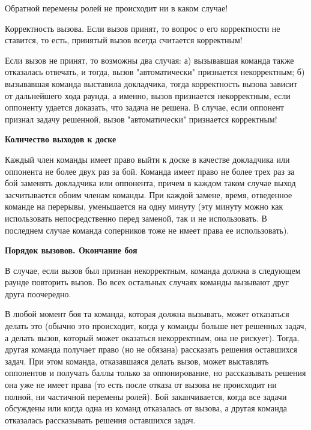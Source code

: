 \documentclass{article}
\begin{document}
Обратной перемены ролей не происходит ни в каком случае!

Корректность вызова. Если вызов принят, то вопрос о его корректности не ставится, то есть, принятый вызов всегда считается корректным!

Если вызов не принят, то возможны два случая: 
а) вызывавшая команда также отказалась отвечать, и тогда, вызов "автоматически" признается некорректным; 
б) вызывавшая команда выставила докладчика, тогда корректность вызова зависит от дальнейшего хода раунда, а именно, вызов признается некорректным, если оппоненту удается доказать, что задача не решена. В случае, если оппонент признал задачу решенной, вызов "автоматически" признается корректным!

\begin{center}
\textbf{Количество выходов к доске}
\end{center}

Каждый член команды имеет право выйти к доске в качестве докладчика или оппонента не более двух раз за бой. Команда имеет право не более трех раз за бой заменять докладчика или оппонента, причем в каждом таком случае выход засчитывается обоим членам команды. При каждой замене, время, отведенное команде на перерывы, уменьшается на одну минуту (эту минуту можно как использовать непосредственно перед заменой, так и не использовать. В последнем случае команда соперников тоже не имеет права ее использовать).

\begin{center}
\textbf{Порядок вызовов. Окончание боя}
\end{center}

В случае, если вызов был признан некорректным, команда должна в следующем раунде повторить вызов. Во всех остальных случаях команды вызывают друг друга поочередно.

В любой момент боя та команда, которая должна вызывать, может отказаться делать это (обычно это происходит, когда у команды больше нет решенных задач, а делать вызов, который может оказаться некорректным, она не рискует). Тогда, другая команда получает право (но не обязана) рассказать решения оставшихся задач. При этом команда, отказавшаяся делать вызов, может выставлять оппонентов и получать баллы только за оппониpование, но рассказывать решения она уже не имеет права (то есть после отказа от вызова не происходит ни полной, ни частичной перемены ролей). Бой заканчивается, когда все задачи обсуждены или когда одна из команд отказалась от вызова, а другая команда отказалась рассказывать решения оставшихся задач.
\end{document}

